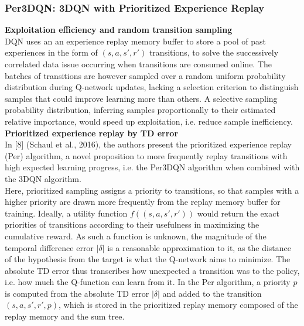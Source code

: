 \subsubsection{Per3DQN: 3DQN with Prioritized Experience Replay} \label{basics}

\textbf{Exploitation efficiency and random transition sampling} \\
DQN uses an an experience replay memory buffer to store a pool of past experiences in the form of $(s,a,s',r')$ transitions, to solve the successively correlated data issue occurring when transitions are consumed online. The batches of transitions are however sampled over a random uniform probability distribution during Q-network updates, lacking a selection criterion to distinguish samples that could improve learning more than others. A selective sampling probability distribution, inferring samples proportionally to their estimated relative importance, would speed up exploitation, i.e. reduce sample inefficiency. \\

\textbf{Prioritized experience replay by TD error} \\
In [8] (Schaul et al., 2016), the authors present the prioritized experience replay (Per) algorithm, a novel proposition to more frequently replay transitions with high expected learning progress, i.e. the Per3DQN algorithm when combined with the 3DQN algorithm. \\
Here, prioritized sampling assigns a priority to transitions, so that samples with a higher priority are drawn more frequently from the replay memory buffer for training. Ideally, a utility function $f((s,a,s',r'))$ would return the exact priorities of transitions according to their usefulness in maximizing the cumulative reward. As such a function is unknown, the magnitude of the temporal difference error $|\delta|$ is a reasonable approximation to it, as the distance of the hypothesis from the target is what the Q-network aims to minimize. The absolute TD error thus transcribes how unexpected a transition was to the policy, i.e. how much the Q-function can learn from it. In the Per algorithm, a priority $p$ is computed from the absolute TD error $|\delta|$ and added to the transition $(s,a,s',r',p)$, which is stored in the prioritized replay memory composed of the replay memory and the sum tree. \\

